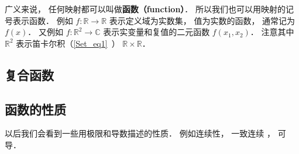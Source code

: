 

\begin{issues}
\issueTODO
\end{issues}


广义来说， 任何映射都可以叫做\textbf{函数（function）}． 所以我们也可以用映射的记号表示函数． 例如 $f: \mathbb R \to \mathbb R$ 表示定义域为实数集， 值为实数的函数， 通常记为 $f(x)$． 又例如 $f: \mathbb R^2 \to \mathbb C$ 表示实变量和复值的二元函数 $f(x_1, x_2)$． 注意其中 $\mathbb R^2$ 表示笛卡尔积（\autoref{Set_eq1}~） $\mathbb R \times \mathbb R$．

\subsection{复合函数}

\subsection{函数的性质}
以后我们会看到一些用极限和导数描述的性质． 例如连续性， 一致连续 %
， 可导．
